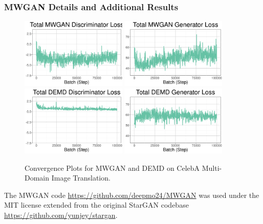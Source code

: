 \subsubsection{MWGAN Details and Additional Results}\label{sec:app-mwgan}
\begin{figure}
    \centering
    \includegraphics[width=0.45\textwidth]{6_demd/figs/mwgan_disc_convergence.png}
    \includegraphics[width=0.45\textwidth]{6_demd/figs/mwgan_gen_convergence.png}
    \includegraphics[width=0.45\textwidth]{6_demd/figs/demd_disc_convergence.png}
    \includegraphics[width=0.45\textwidth]{6_demd/figs/demd_gen_convergence.png}
    \caption[CelebA image translation convergence]{Convergence Plots for MWGAN and DEMD on CelebA Multi-Domain Image Translation.}
    \label{fig:convergence}
\end{figure}

The MWGAN code \url{https://github.com/deepmo24/MWGAN} was used under the MIT license extended from the original StarGAN codebase \url{https://github.com/yunjey/stargan}.

